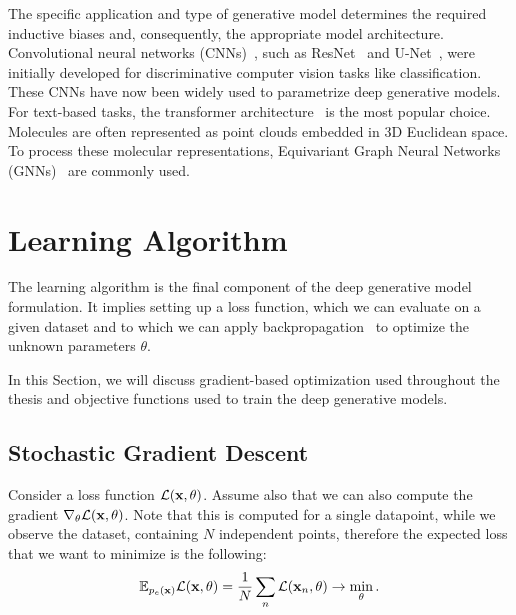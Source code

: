 The specific application and type of generative model determines the required inductive biases and, consequently, the appropriate model architecture.
Convolutional neural networks (CNNs)~\citep{krizhevsky2012imagenet}, such as ResNet~\citep{he2016deep} and U-Net~\citep{ronneberger2015u}, were initially developed for discriminative computer vision tasks like classification. These CNNs have now been widely used to parametrize deep generative models. For text-based tasks, the transformer architecture~\citep{vaswani2017attention} is the most popular choice. Molecules are often represented as point clouds embedded in 3D Euclidean space. To process these molecular representations, Equivariant Graph Neural Networks (GNNs)~\citep{satorras2021n} are commonly used. 

\section{Learning Algorithm}
The learning algorithm is the final component of the deep generative model formulation. 
It implies setting up a loss function, which we can evaluate on a given dataset and to which we can apply backpropagation~\citep{rumelhart1986learning} to optimize the unknown parameters $\theta$. 

In this Section, we will discuss gradient-based optimization used throughout the thesis and objective functions used to train the deep generative models. 

\subsection{Stochastic Gradient Descent}
Consider a loss function $\mathcal{L}({\mathbf{x}}, \theta)$. 
Assume also that we can also compute the gradient $\nabla_\theta \mathcal{L}({\mathbf{x}}, \theta)$. Note that this is computed for a single datapoint, while we observe the dataset, containing $N$ independent points, therefore the expected loss that we want to minimize is the following:
\begin{equation}\label{eq:intro_loss}
\E_{p_e(\rvx)} \mathcal{L}(\rvx, \theta) = \frac1N \sum_n \mathcal{L}(\rvx_n, \theta) \rightarrow \min_{\theta}.
\end{equation}

